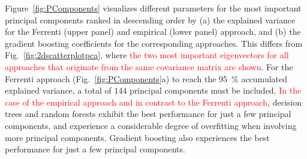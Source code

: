 \documentclass[superscriptaddress,unsortedaddress,
 amsmath,amssymb,
 aps,
]{revtex4-2}
\newcommand{\mrk}[1]{\textcolor{red}{#1}}
\begin{document}
Figure~\ref{fig:PComponents} visualizes different parameters for the most important principal components ranked in descending order by (a) the explained variance for the Ferrenti (upper panel) and empirical (lower panel) approach, and (b) the gradient boosting coefficients for the corresponding approaches. This differs from Fig.~\ref{fig:2dscatterplotpca}, where \mrk{the two most important eigenvectors for all approaches that originate from the same covariance matrix are shown}. 
For the Ferrenti approach (Fig.~\ref{fig:PComponents}a) to reach the \SI{95}{\percent} accumulated explained variance, a total of $144$ principal components must be included. \mrk{In the case of the empirical approach and in contrast to the Ferrenti approach}, decision trees and random forests exhibit the best performance for just a few principal components, and experience a considerable degree of overfitting when involving more principal components. Gradient boosting 
also experiences the best performance for just a few principal components. 
\end{document}
